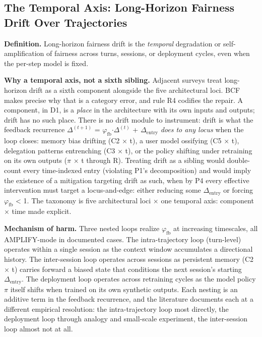 \documentclass[acmsmall,nonacm]{acmart}
\begin{document}
\subsection{The Temporal Axis: Long-Horizon Fairness Drift Over Trajectories}

\textbf{Definition.} Long-horizon fairness drift is the \emph{temporal} degradation or self-amplification of fairness across turns, sessions, or deployment cycles, even when the per-step model is fixed.

\textbf{Why a temporal axis, not a sixth sibling.} Adjacent surveys treat long-horizon drift as a sixth component alongside the five architectural loci. BCF makes precise why that is a category error, and rule R4 codifies the repair. A component, in D1, is a \emph{place} in the architecture with its own inputs and outputs; drift has no such place. There is no drift module to instrument: drift is what the feedback recurrence $\Delta^{(t+1)}$ = $\varphi_{\mathrm{fb}}$$\cdot$$\Delta^{(t)}$ + $\Delta_{\mathrm{entry}}$ \emph{does to any locus} when the loop closes: memory bias drifting (C2 $\times$ t), a user model ossifying (C5 $\times$ t), delegation patterns entrenching (C3 $\times$ t), or the policy shifting under retraining on its own outputs ($\pi$ $\times$ t through R). Treating drift as a sibling would double-count every time-indexed entry (violating P1's decomposition) and would imply the existence of a mitigation targeting drift as such, when by P4 every effective intervention must target a locus-and-edge: either reducing some $\Delta_{\mathrm{entry}}$ or forcing $\varphi_{\mathrm{fb}}$ < 1. The taxonomy is five architectural loci $\times$ one temporal axis: component $\times$ time made explicit.

\textbf{Mechanism of harm.} Three nested loops realize $\varphi_{\mathrm{fb}}$ at increasing timescales, all AMPLIFY-mode in documented cases. The intra-trajectory loop (turn-level) operates within a single session as the context window accumulates a directional history. The inter-session loop operates across sessions as persistent memory (C2 $\times$ t) carries forward a biased state that conditions the next session's starting $\Delta_{\mathrm{entry}}$. The deployment loop operates across retraining cycles as the model policy $\pi$ itself shifts when trained on its own synthetic outputs. Each nesting is an additive term in the feedback recurrence, and the literature documents each at a different empirical resolution: the intra-trajectory loop most directly, the deployment loop through analogy and small-scale experiment, the inter-session loop almost not at all.
\end{document}
